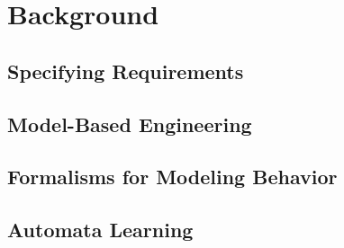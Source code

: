 \chapter{Background}

\section{Specifying Requirements} \label{sec_backgrspecreq}


\section{Model-Based Engineering} \label{sec_backgrmbe}

\section{Formalisms for Modeling Behavior} \label{sec_backgrmodeling}






\section{Automata Learning} \label{sec_backgrautomatalearning}


